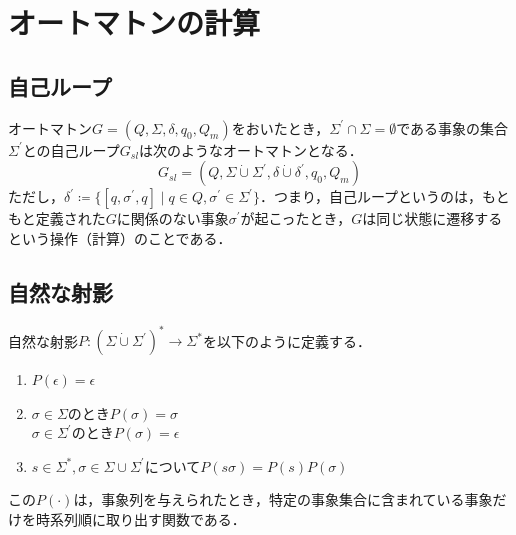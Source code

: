 \section{オートマトンの計算}

\subsection{自己ループ}

オートマトン$G = (Q, \Sigma, \delta, q_0, Q_m)$をおいたとき，$\Sigma^\prime \cap \Sigma=\emptyset$である事象の集合$\Sigma^\prime$との自己ループ$G_{sl}$は次のようなオートマトンとなる．
\begin{equation}
    G_{sl}=(Q,\Sigma\dot{\cup}\Sigma^\prime,\delta\dot{\cup}\delta^\prime,q_0,Q_m)
\end{equation}
ただし，$\delta^\prime\coloneqq\{[q,\sigma^\prime,q]\mid q\in Q,\sigma^\prime\in\Sigma^\prime\}$．つまり，自己ループというのは，もともと定義された$G$に関係のない事象$\sigma^\prime$が起こったとき，$G$は同じ状態に遷移するという操作（計算）のことである．


\subsection{自然な射影}

自然な射影$P\colon{(\Sigma\dot{\cup}\Sigma^\prime)}^\ast\rightarrow\Sigma^\ast$を以下のように定義する．

\begin{enumerate}
\renewcommand{\labelenumi}{(\roman{enumi})}
    \item $P(\epsilon) = \epsilon$
    \item $\sigma\in\Sigma$のとき$P(\sigma)=\sigma$\\
          $\sigma\in\Sigma^\prime$のとき$P(\sigma)=\epsilon$
    \item $s\in\Sigma^\ast,\sigma\in\Sigma\cup\Sigma^\prime$について$P(s\sigma) = P(s)P(\sigma)$
\end{enumerate}

この$P(\cdot)$は，事象列を与えられたとき，特定の事象集合に含まれている事象だけを時系列順に取り出す関数である．

